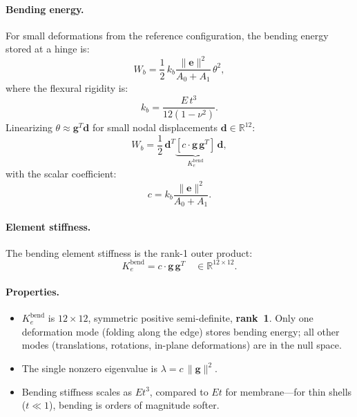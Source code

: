 \paragraph{Bending energy.}
For small deformations from the reference configuration, the bending energy stored at a hinge is:
\begin{equation}
  W_b = \frac{1}{2}\, k_b \frac{\|\mathbf{e}\|^2}{A_0 + A_1}\, \theta^2,
\end{equation}
where the flexural rigidity is:
\begin{equation}
  k_b = \frac{E\, t^3}{12(1 - \nu^2)}.
\end{equation}
Linearizing $\theta \approx \mathbf{g}^T \mathbf{d}$ for small nodal displacements $\mathbf{d} \in \mathbb{R}^{12}$:
\begin{equation}
  W_b = \frac{1}{2}\, \mathbf{d}^T \underbrace{\left[ c \cdot \mathbf{g}\,\mathbf{g}^T \right]}_{K_e^{\text{bend}}}\, \mathbf{d},
\end{equation}
with the scalar coefficient:
\begin{equation}
  c = k_b \frac{\|\mathbf{e}\|^2}{A_0 + A_1}.
\end{equation}

\paragraph{Element stiffness.}
The bending element stiffness is the rank-1 outer product:
\begin{equation}
  K_e^{\text{bend}} = c \cdot \mathbf{g}\,\mathbf{g}^T \quad \in \mathbb{R}^{12 \times 12}.
\end{equation}

\paragraph{Properties.}
\begin{itemize}
  \item $K_e^{\text{bend}}$ is $12 \times 12$, symmetric positive semi-definite, \textbf{rank~1}. Only one deformation mode (folding along the edge) stores bending energy; all other modes (translations, rotations, in-plane deformations) are in the null space.
  \item The single nonzero eigenvalue is $\lambda = c\,\|\mathbf{g}\|^2$.
  \item Bending stiffness scales as $E t^3$, compared to $E t$ for membrane---for thin shells ($t \ll 1$), bending is orders of magnitude softer.
\end{itemize}

